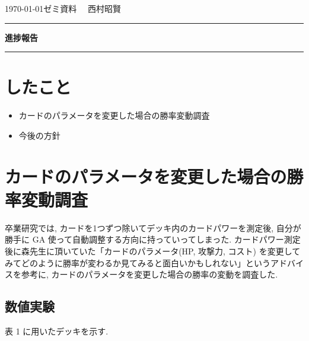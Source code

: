 \documentclass{jarticle}     %
\begin{document}
  \noindent
  \hspace{1em}

  \today ゼミ資料
  \hfill
  \ \  西村昭賢 

  \vspace{2mm}
  \hrule
  \begin{center}
  {\Large \bf 進捗報告}
  \end{center}
  \hrule
  \vspace{3mm}

\section{したこと}
\begin{itemize}
  \item カードのパラメータを変更した場合の勝率変動調査
  \item 今後の方針
\end{itemize}

\section{カードのパラメータを変更した場合の勝率変動調査}
卒業研究では, カードを1つずつ除いてデッキ内のカードパワーを測定後, 自分が勝手に GA 使って自動調整する方向に持っていってしまった. カードパワー測定後に森先生に頂いていた「カードのパラメータ(HP, 攻撃力, コスト) を変更してみてどのように勝率が変わるか見てみると面白いかもしれない」というアドバイスを参考に, カードのパラメータを変更した場合の勝率の変動を調査した. 

\subsection{数値実験}
表 1 に用いたデッキを示す.
\end{document}
